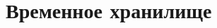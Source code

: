 \documentclass[a4paper,10pt,fleqn]{book}
\begin{document}


\part{Временное хранилище}


\end{document}
